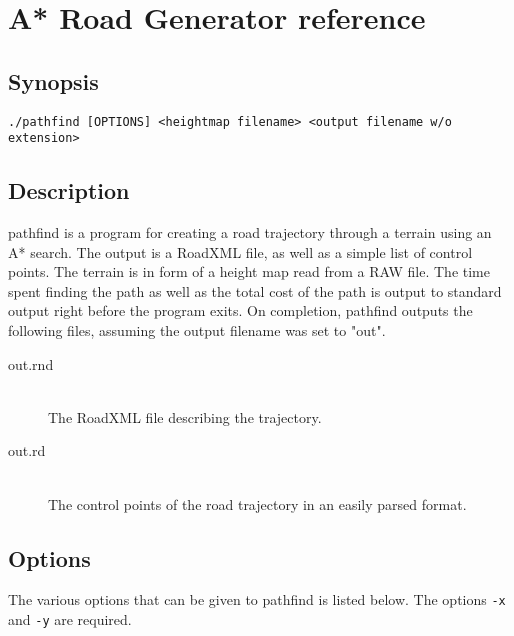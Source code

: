 \chapter{A* Road Generator reference}

\section*{Synopsis}
\texttt{./pathfind [OPTIONS] <heightmap filename> <output filename w/o extension>}

\section*{Description}
pathfind is a program for creating a road trajectory through a terrain using an A* search. The output is a RoadXML file, as well as a simple list of control points. The terrain is in form of a height map read from a RAW file. The time spent finding the path as well as the total cost of the path is output to standard output right before the program exits. On completion, pathfind outputs the following files, assuming the output filename was set to "out".
\begin{description}
\item[out.rnd] \hfill \\
The RoadXML file describing the trajectory.
\item[out.rd] \hfill \\
The control points of the road trajectory in an easily parsed format.
\end{description}



\section*{Options}
The various options that can be given to pathfind is listed below. The options \texttt{-x} and \texttt{-y} are required.

